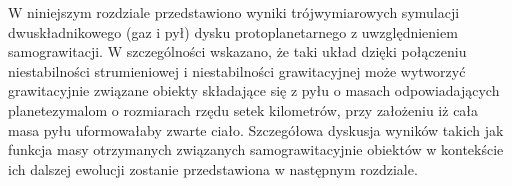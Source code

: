 \par W niniejszym rozdziale przedstawiono wyniki trójwymiarowych symulacji
dwuskładnikowego (gaz i pył) dysku protoplanetarnego z uwzględnieniem
samograwitacji. W szczególności wskazano, że taki układ dzięki połączeniu
niestabilności strumieniowej i niestabilności grawitacyjnej może wytworzyć
grawitacyjnie związane obiekty składające się z pyłu o masach odpowiadających
planetezymalom o rozmiarach rzędu setek kilometrów, przy założeniu iż cała masa
pyłu uformowałaby zwarte ciało. Szczegółowa dyskusja wyników takich jak funkcja
masy otrzymanych związanych samograwitacyjnie obiektów w kontekście ich dalszej
ewolucji zostanie przedstawiona w następnym rozdziale.
%
%
%
%   
